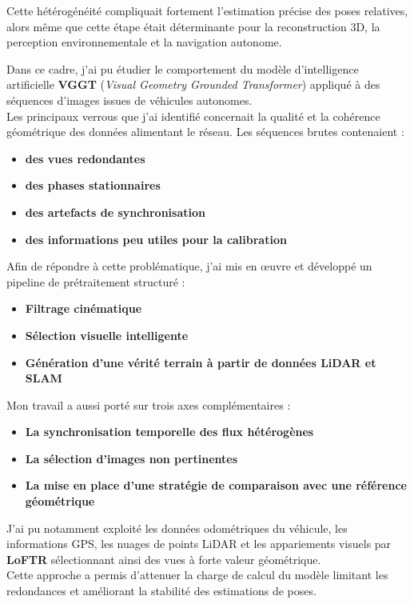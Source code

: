 \documentclass[12pt,a4paper,oneside]{report}
\begin{document}
Cette hétérogénéité compliquait fortement l'estimation précise des poses relatives, alors même que cette étape était déterminante pour la reconstruction 3D, la perception environnementale et la navigation autonome.

\bigskip

Dans ce cadre, j'ai pu étudier le comportement du modèle d'intelligence artificielle \textbf{VGGT} (\textit{Visual Geometry Grounded Transformer}) appliqué à des séquences d'images issues de véhicules autonomes. \\
\hspace*{.3cm}Les principaux verrous que j'ai identifié concernait la qualité et la cohérence géométrique des données alimentant le réseau. Les séquences brutes contenaient :
\begin{itemize}[label=\textbullet]
    \item \textbf{des vues redondantes}
    \item \textbf{des phases stationnaires}
    \item \textbf{des artefacts de synchronisation}
    \item \textbf{des informations peu utiles pour la calibration}
\end{itemize}

\bigskip

Afin de répondre à cette problématique, j'ai mis en œuvre et développé un pipeline de prétraitement structuré : 
\begin{itemize}[label=\textbullet]
    \item \textbf{Filtrage cinématique}
    \item \textbf{Sélection visuelle intelligente}
    \item \textbf{Génération d'une vérité terrain à partir de données LiDAR et SLAM}
\end{itemize}

\bigskip

Mon travail a aussi porté sur trois axes complémentaires :
    \begin{itemize}[label=\textbullet]
    \item \textbf{La synchronisation temporelle des flux hétérogènes}
    \item \textbf{La sélection d'images non pertinentes}
    \item \textbf{La mise en place d'une stratégie de comparaison avec une référence géométrique}
\end{itemize}

\hspace*{1cm} J'ai pu notamment exploité les données odométriques du véhicule, les informations GPS, les nuages de points LiDAR et les appariements visuels par \textbf{LoFTR} sélectionnant ainsi des vues à forte valeur géométrique.\\
Cette approche a permis d'attenuer la charge de calcul du modèle limitant les redondances et améliorant la stabilité des estimations de poses.
\end{document}

